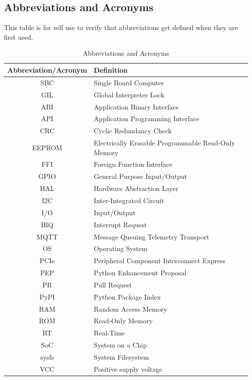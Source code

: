 \documentclass[conference]{IEEEtran}
\begin{document}
\subsection{Abbreviations and Acronyms}\label{AA}
This table is for self use to verify that abbreviations get defined when they are first used.
\begin{table}[htbp]
\caption{Abbreviations and Acronyms}
\begin{center}
\begin{tabular}{|c|p{4.5cm}|}
\hline
\textbf{Abbreviation/Acronym}&\textbf{Definition} \\
\hline
SBC & Single Board Computer \\
\hline
GIL & Global Interpreter Lock \\
\hline
ABI & Application Binary Interface \\
\hline
API & Application Programming Interface \\
\hline
CRC & Cyclic Redundancy Check \\
\hline
EEPROM & Electrically Erasable Programmable Read-Only Memory \\
\hline
FFI & Foreign Function Interface \\
\hline
GPIO & General Purpose Input/Output \\
\hline
HAL & Hardware Abstraction Layer \\
\hline
I2C & Inter-Integrated Circuit \\
\hline
I/O & Input/Output \\
\hline
IRQ & Interrupt Request \\
\hline
MQTT & Message Queuing Telemetry Transport \\
\hline
OS & Operating System \\
\hline
PCIe & Peripheral Component Interconnect Express \\
\hline
PEP & Python Enhancement Proposal \\
\hline
PR & Pull Request \\
\hline
PyPI & Python Package Index \\
\hline
RAM & Random Access Memory \\
\hline
ROM & Read-Only Memory \\
\hline
RT & Real-Time \\
\hline
SoC & System on a Chip \\
\hline
sysfs & System Filesystem \\
\hline
VCC & Positive supply voltage \\
\hline
\end{tabular}
\end{center}
\end{table}
\end{document}
